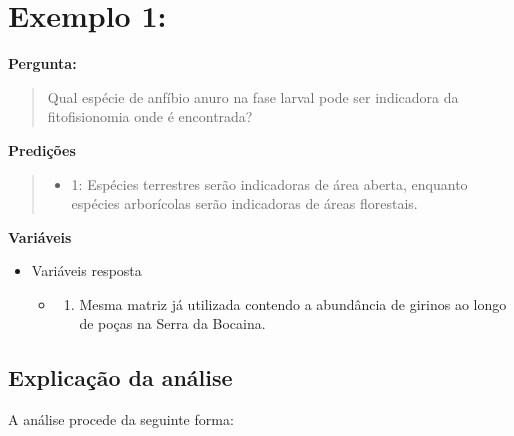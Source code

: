 \documentclass[
]{book}
\providecommand{\tightlist}{%
  \setlength{\itemsep}{0pt}\setlength{\parskip}{0pt}}
\begin{document}
\hypertarget{exemplo-1-2}{%
\section{Exemplo 1:}\label{exemplo-1-2}}

\textbf{Pergunta:}

\begin{quote}
Qual espécie de anfíbio anuro na fase larval pode ser indicadora da fitofisionomia onde é encontrada?
\end{quote}

\textbf{Predições}

\begin{quote}
\begin{itemize}
\tightlist
\item
  1: Espécies terrestres serão indicadoras de área aberta, enquanto espécies arborícolas serão indicadoras de áreas florestais.
\end{itemize}
\end{quote}

\textbf{Variáveis}

\begin{itemize}
\tightlist
\item
  Variáveis resposta

  \begin{itemize}
  \item
    \begin{enumerate}
    \def\labelenumi{\arabic{enumi}.}
    \tightlist
    \item
      Mesma matriz já utilizada contendo a abundância de girinos ao longo de poças na Serra da Bocaina.
    \end{enumerate}
  \end{itemize}
\end{itemize}

\hypertarget{explicauxe7uxe3o-da-anuxe1lise-2}{%
\subsection{Explicação da análise}\label{explicauxe7uxe3o-da-anuxe1lise-2}}

A análise procede da seguinte forma:
\end{document}
